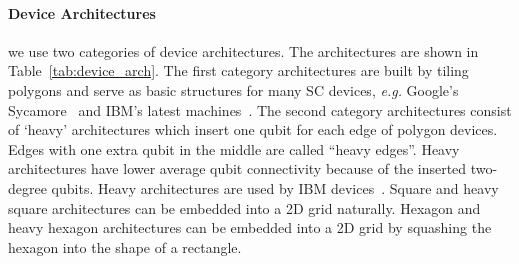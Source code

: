 \paragraph{Device Architectures} %
we use two categories of device architectures. The architectures are shown in Table~\ref{tab:device_arch}. The first category architectures are built by tiling polygons and serve as basic structures for many SC devices, \emph{e.g.} Google's Sycamore~\cite{Arute2019QuantumSU} and IBM's latest machines~\cite{Jurcevic2020DemonstrationOQ}. The second category architectures consist of `heavy' architectures which insert one qubit for each edge of polygon devices. Edges with one extra qubit in the middle are called ``heavy edges''.
Heavy architectures have lower average qubit connectivity because of the inserted two-degree qubits. Heavy architectures are used by IBM devices~\cite{Jurcevic2020DemonstrationOQ}. Square and heavy square architectures can be embedded into a 2D grid naturally. Hexagon and heavy hexagon architectures can be embedded into a 2D grid by squashing the hexagon into the shape of a rectangle.


